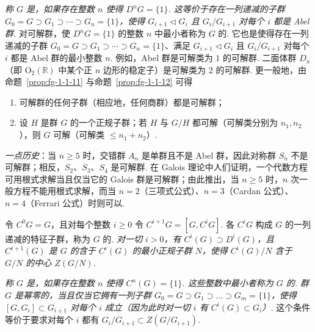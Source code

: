 \begin{numpara}[可解群]\label{np:fg-3-2-5}
\emph{称 $G$ 是，如果存在整数 $n$ 使得 $D^nG=\{1\}$. 这等价于存在一列递减的子群 $G_0=G\supset G_1\supset\cdots\supset G_n=\{1\}$，使得 $G_{i+1}\triangleleft G_i$ 且 $G_i/G_{i+1}$ 对每个 $i$ 都是 Abel 群.}
对可解群，使 $D^nG=\{1\}$ 的整数 $n$ 中最小者称为 $G$ 的. 它也是使得存在一列递减的子群 $G_0=G\supset G_1\supset\cdots\supset G_n=\{1\}$、满足 $G_{i+1}\triangleleft G_i$ 且 $G_i/G_{i+1}$ 对每个 $i$ 都是 Abel 群的最小整数 $n$.
例如，Abel 群是可解类为 $1$ 的可解群. 二面体群 $D_n$（即 $\mathrm{O}_2(\mathbb{R})$ 中某个正 $n$ 边形的稳定子）是可解类为 $2$ 的可解群. 更一般地，由命题~\ref{prop:fg-1-1-11} 与命题~\ref{prop:fg-1-1-12} 可得
\end{numpara}

\begin{proposition}\label{prop:fg-3-2-6}
\begin{enumerate}[label=\roman*)]
\item 可解群的任何子群（相应地，任何商群）都是可解群；
\item 设 $H$ 是群 $G$ 的一个正规子群；若 $H$ 与 $G/H$ 都可解（可解类分别为 $n_1,n_2$），则 $G$ 可解（可解类 $\leqslant n_1+n_2$）.
\end{enumerate}
\end{proposition}

\emph{一点历史}：当 $n\geqslant5$ 时，交错群 $A_n$ 是单群且不是 Abel 群，因此对称群 $S_n$ 不是可解群；相反，$S_2$、$S_3$、$S_4$ 是可解群. 在 Galois 理论中人们证明，一个代数方程可用根式求解当且仅当它的 Galois 群是可解群；由此推出，当 $n\geqslant5$ 时，$n$ 次一般方程不能用根式求解，而当 $n=2$（三项式公式）、$n=3$（Cardan 公式）、$n=4$（Ferrari 公式）时则可以.

\begin{numpara}[降中心列]\label{np:fg-3-2-7}
令 $C^0G=G$，且对每个整数 $i\geqslant0$ 令 $C^{i+1}G=[G,C^iG]$. 各 $C^iG$ 构成 $G$ 的一列递减的特征子群，称为 $G$ 的. \emph{对一切 $i>0$，有 $C^i(G)\supset D^i(G)$，且 $C^{i+1}(G)$ 是 $G$ 的含于 $C^i(G)$ 的最小正规子群 $N$，使得 $C^i(G)/N$ 含于 $G/N$ 的中心 $Z(G/N)$.}
\end{numpara}

\begin{numpara}[幂零群]\label{np:fg-3-2-8}
\emph{称 $G$ 是，如果存在整数 $n$ 使得 $C^n(G)=\{1\}$. 这些整数中最小者称为 $G$ 的. 群 $G$ 是幂零的，当且仅当它拥有一列子群 $G_0=G\supset G_1\supset\dots\supset G_m=\{1\}$，使得 $[G,G_i]\subset G_{i+1}$ 对每个 $i$ 成立（因为此时对一切 $i$ 有 $C^i(G)\subset G_i$）.} 这个条件等价于要求对每个 $i$ 都有 $G_i/G_{i+1}\subset Z(G/G_{i+1})$.
\end{numpara}

